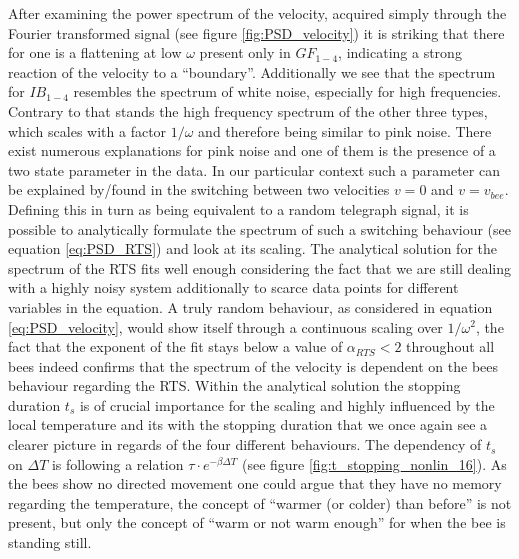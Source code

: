 After examining the power spectrum of the velocity, acquired simply through the Fourier transformed signal (see figure \ref{fig:PSD_velocity}) it is striking that there for one is a flattening at low $\omega$ present only in $GF_{1-4}$, indicating a strong reaction of the velocity to a ``boundary''. Additionally we see that the spectrum for $IB_{1-4}$ resembles the spectrum of white noise, especially for high frequencies. Contrary to that stands the high frequency spectrum of the other three types, which scales with a factor $1/\omega$ and therefore being similar to pink noise. There exist numerous explanations for pink noise and one of them is the presence of a two state parameter in the data. In our particular context such a parameter can be explained by/found in the switching between two velocities $v=0$ and $v=v_{bee}$. Defining this in turn as being equivalent to a random telegraph signal, it is possible to analytically formulate the spectrum of such a switching behaviour (see equation \ref{eq:PSD_RTS}) and look at its scaling.
The analytical solution for the spectrum of the RTS fits well enough considering the fact that we are still dealing with a highly noisy system additionally to scarce data points for different variables in the equation. A truly random behaviour, as considered in equation \ref{eq:PSD_velocity}, would show itself through a continuous scaling over $1/\omega^{2}$, the fact that the exponent of the fit stays below a value of $\alpha_{RTS}<2$ throughout all bees indeed confirms that the spectrum of the velocity is dependent on the bees behaviour regarding the RTS. Within the analytical solution the stopping duration $t_{s}$ is of crucial importance for the scaling and highly influenced by the local temperature and its with the stopping duration that we once again see a clearer picture in regards of the four different behaviours. The dependency of $t_{s}$ on $\Delta T$ is following a relation $\tau \cdot e^{-\beta \Delta T}$ (see figure \ref{fig:t_stopping_nonlin_16}). As the bees show no directed movement one could argue that they have no memory regarding the temperature, the concept of ``warmer (or colder) than before'' is not present, but only the concept of ``warm or not warm enough'' for when the bee is standing still.
\\
